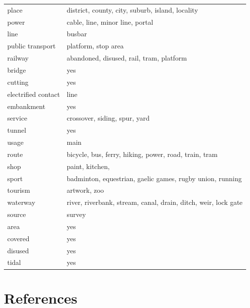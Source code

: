 \documentclass[]{elsarticle} %
\begin{document}
\begin{table}[t]
\begin{tabular}{l>{\raggedright\arraybackslash}p{3in}}
place & district, county, city, suburb, island, locality\\
power & cable, line, minor line, portal\\
line & busbar\\
public transport & platform, stop area\\
railway & abandoned, disused, rail, tram, platform\\
bridge & yes\\
cutting & yes\\
electrified contact & line\\
embankment & yes\\
service & crossover, siding, spur, yard\\
tunnel & yes\\
usage & main\\
route & bicycle, bus, ferry, hiking, power, road, train, tram\\
shop & paint, kitchen,\\
sport & badminton, equestrian, gaelic games, rugby union, running\\
tourism & artwork, zoo\\
waterway & river, riverbank, stream, canal, drain, ditch, weir, lock gate\\
source & survey\\
area & yes\\
covered & yes\\
disused & yes\\
tidal & yes\\
\bottomrule
\end{tabular}
\end{table}

\section*{References}\label{references}
\end{document}
